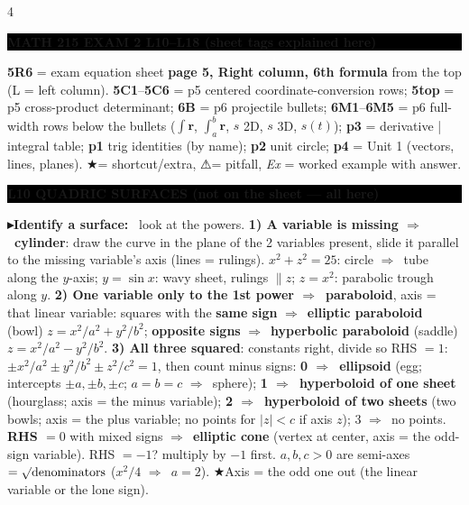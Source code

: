 \documentclass{article}
\newcommand\bodysize{3.55}      %
\newcommand\bodylead{3.774}     %
\newcommand\vb[1]{\symbf{#1}}                 %
\newcommand\sh[1]{{\setlength\fboxsep{0.18pt}\colorbox{black!22}{\textbf{#1}}}} %
\newcommand\hd[1]{\par\vspace{0.5pt}\needspace{4\baselineskip}\noindent
  {\setlength\fboxsep{0.45pt}\colorbox{black}{\parbox{\dimexpr\linewidth-2\fboxsep}{\color{white}\bfseries #1}}}\par\nobreak\vspace{0.2pt}\nobreak}
\newcommand\pt[1]{\par\textbf{{\symf ▸}#1}\ }  %
\newcommand\warn{{\symf ⚠}}                    %
\newcommand\shc{{\symf ★}}                      %
\newcommand\rt{\smash{\surd}}               %
\newcommand\then{\ensuremath{\Rightarrow}}
\begin{document}
\fontsize{\bodysize}{\bodylead}\selectfont
\begin{multicols*}{4}

\hd{MATH 215 EXAM 2 \quad L10–L18 \quad (sheet tags explained here)}
\sh{5R6} = exam equation sheet \textbf{page 5, Right column, 6th formula} from the top (L = left column). \sh{5C1}–\sh{5C6} = p5 centered coordinate-conversion rows; \sh{5top} = p5 cross-product determinant; \sh{6B} = p6 projectile bullets; \sh{6M1}–\sh{6M5} = p6 full-width rows below the bullets ($\int\vb r$, $\int_a^b\vb r$, $s$ 2D, $s$ 3D, $s(t)$); \sh{p3} = derivative | integral table; \sh{p1} trig identities (by name); \sh{p2} unit circle; \sh{p4} = Unit 1 (vectors, lines, planes). \shc = shortcut/extra, \warn = pitfall, \textit{Ex} = worked example with answer.

\hd{L10 QUADRIC SURFACES \quad (not on the sheet — all here)}
\pt{Identify a surface:} look at the powers. \textbf{1) A variable is missing \then\ cylinder}: draw the curve in the plane of the 2 variables present, slide it parallel to the missing variable's axis (lines = rulings). $x^2+z^2=25$: circle \then\ tube along the $y$-axis; $y=\sin x$: wavy sheet, rulings $\parallel z$; $z=x^2$: parabolic trough along $y$. \textbf{2) One variable only to the 1st power \then\ paraboloid}, axis = that linear variable: squares with the \textbf{same sign} \then\ \textbf{elliptic paraboloid} (bowl) $z=x^2/a^2+y^2/b^2$; \textbf{opposite signs} \then\ \textbf{hyperbolic paraboloid} (saddle) $z=x^2/a^2-y^2/b^2$. \textbf{3) All three squared}: constants right, divide so RHS $=1$: $\pm x^2/a^2\pm y^2/b^2\pm z^2/c^2=1$, then count minus signs: \textbf{0 \then\ ellipsoid} (egg; intercepts $\pm a,\pm b,\pm c$; $a{=}b{=}c$ \then\ sphere); \textbf{1 \then\ hyperboloid of one sheet} (hourglass; axis = the minus variable); \textbf{2 \then\ hyperboloid of two sheets} (two bowls; axis = the plus variable; no points for $|z|<c$ if axis $z$); 3 \then\ no points. \textbf{RHS $=0$} with mixed signs \then\ \textbf{elliptic cone} (vertex at center, axis = the odd-sign variable). RHS $=-1$? multiply by $-1$ first. $a,b,c>0$ are semi-axes $=\rt\text{denominators}$ ($x^2/4$ \then\ $a=2$). \shc Axis = the odd one out (the linear variable or the lone sign).


\end{multicols*}
\end{document}
